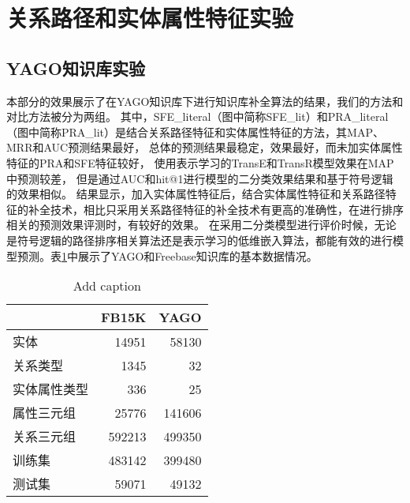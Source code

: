 \section{关系路径和实体属性特征实验}

\subsection{YAGO知识库实验}
\label{cha:exp-literal}
本部分的效果展示了在YAGO知识库下进行知识库补全算法的结果，我们的方法和对比方法被分为两组。
其中，SFE\_literal（图中简称SFE\_lit）和PRA\_literal（图中简称PRA\_lit）是结合关系路径特征和实体属性特征的方法，其MAP、MRR和AUC预测结果最好，
总体的预测结果最稳定，效果最好，而未加实体属性特征的PRA和SFE特征较好，
使用表示学习的TransE和TransR模型效果在MAP中预测较差，
但是通过AUC和hit@1进行模型的二分类效果结果和基于符号逻辑的效果相似。
结果显示，加入实体属性特征后，结合实体属性特征和关系路径特征的补全技术，相比只采用关系路径特征的补全技术有更高的准确性，在进行排序相关的预测效果评测时，有较好的效果。
在采用二分类模型进行评价时候，无论是符号逻辑的路径排序相关算法还是表示学习的低维嵌入算法，都能有效的进行模型预测。表\ref{tab:addlabel-kbcExp-data}中展示了YAGO和Freebase知识库的基本数据情况。

\begin{table}[htbp]
  \centering
  \caption{Add caption}
    \begin{tabular}{|l|r|r|}
    \hline
    \textcolor[rgb]{ .141,  .161,  .18}{} & \multicolumn{1}{l|}{FB15K} & \multicolumn{1}{l|}{YAGO} \\
    \hline
    实体    & 14951 & 58130 \\
    \hline
    关系类型  & 1345  & 32 \\
    \hline
    实体属性类型 & 336   & 25 \\
    \hline
    属性三元组 & 25776 & 141606 \\
    \hline
    关系三元组 & 592213 & 499350 \\
    \hline
    训练集   & 483142 & 399480 \\
    \hline
    测试集   & 59071 & 49132 \\
    \hline
    \end{tabular}%
  \label{tab:addlabel-kbcExp-data}%
\end{table}%

